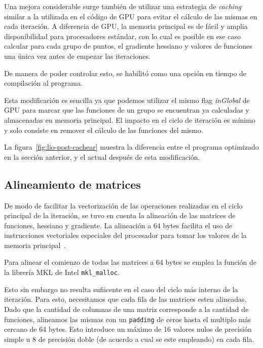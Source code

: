 Una mejora considerable surge tambi\'en de utilizar una estrategia de \textit{caching}
similar a la utilizada en el c\'odigo de GPU para evitar el c\'alculo de las mismas
en cada iteraci\'on. A diferencia de GPU, la memoria principal es de f\'acil y
amplia disponibilidad para procesadores est\'andar, con lo cual es posible en ese
caso calcular para cada grupo de puntos, el gradiente hessiano y valores de 
funciones una \'unica vez antes de empezar las iteraciones.

De manera de poder controlar esto, se habilit\'o como una opci\'on en tiempo de
compilaci\'on al programa.

Esta modificaci\'on es sencilla ya que podemos utilizar el mismo flag 
\textit{inGlobal} de GPU para marcar que las funciones de un grupo se encuentran
ya calculadas y almacenadas en memoria principal. El impacto en el ciclo de 
iteraci\'on es m\'inimo y solo consiste en remover el c\'alculo de las funciones
del mismo.

La figura~\ref{fig:lio-post-cachear} muestra la diferencia entre el programa
optimizado en la secci\'on anterior, y el actual despu\'es de esta modificaci\'on.


\subsection{Alineamiento de matrices}

De modo de facilitar la vectorizaci\'on de las operaciones realizadas en el 
ciclo principal de la iteraci\'on, se tuvo en cuenta la alineaci\'on de las 
matrices de funciones, hessiano y gradiente. La alineaci\'on a 64 bytes facilita
el uso de instrucciones vectoriales especiales del procesador para tomar los 
valores de la memoria principal~\cite{AutovectorizationGuide}.

Para alinear el comienzo de todas las matrices a 64 bytes se emplea la funci\'on
de la librer\'ia MKL de Intel \texttt{mkl\_malloc}.

Esto sin embargo no resulta sufiicente en el caso del ciclo m\'as interno de
la iteraci\'on. Para esto, necesitamos que cada fila de las matrices esten alineadas.
Dado que la cantidad de columnas de una matriz corresponde a la cantidad de funciones,
alineamos las mismas con un \texttt{padding} de ceros hasta el multiplo m\'as 
cercano de 64 bytes. Esto introduce un m\'aximo de 16 valores nulos de precisi\'on 
simple u 8 de precisi\'on doble (de acuerdo a cual se este empleando) en cada
fila.

